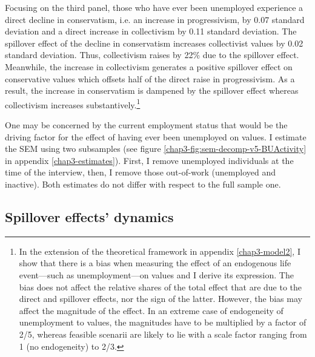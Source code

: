 Focusing on the third panel, those who have ever been unemployed experience a direct decline in conservatism, i.e. an increase in progressivism, by 0.07 standard deviation and a direct increase in collectivism by 0.11 standard deviation. The spillover effect of the decline in conservatism increases collectivist values by 0.02 standard deviation. Thus, collectivism raises by 22\% due to the spillover effect. Meanwhile, the increase in collectivism generates a positive spillover effect on conservative values which offsets half of the direct raise in progressivism. As a result, the increase in conservatism is dampened by the spillover effect whereas collectivism increases substantively.\footnote{In the extension of the theoretical framework in appendix \ref{chap3-model2}, I show that there is a bias when measuring the effect of an endogenous life event---such as unemployment---on values and I derive its expression. The bias does not affect the relative shares of the total effect that are due to the direct and spillover effects, nor the sign of the latter. However, the bias may affect the magnitude of the effect. In an extreme case of endogeneity of unemployment to values, the magnitudes have to be multiplied by a factor of 2/5, whereas feasible scenarii are likely to lie with a scale factor ranging from 1 (no endogeneity) to 2/3.}

One may be concerned by the current employment status that would be the driving factor for the effect of having ever been unemployed on values. I estimate the SEM using two subsamples (see figure \ref{chap3-fig:sem-decomp-v5-BUActivity} in appendix \ref{chap3-estimates}). First, I remove unemployed individuals at the time of the interview, then, I remove those out-of-work (unemployed and inactive). Both estimates do not differ with respect to the full sample one.

\subsection{Spillover effects' dynamics}

